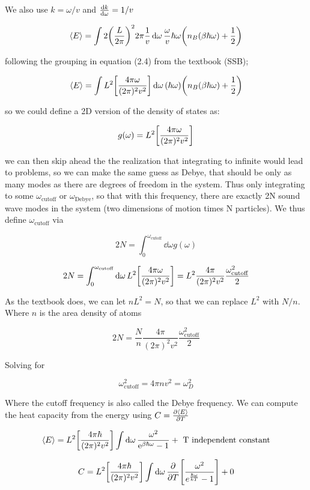 We also use $k=\omega/v$ and $\dv{k}{\omega} = 1/v$

\[ \avg{E} =  \int 2 \paren*{\frac{L}{2\pi}}^2 2 \pi \frac{1}{v} \dd{\omega} \frac{\omega}{v} \hbar \omega  \paren*{n_B ( \beta \hbar \omega) + \frac{1}{2}}\]

following the grouping in equation (2.4) from the textbook (SSB);

\[ \avg{E} =  \int L^2  \brackets*{\frac{4\pi\omega} {(2\pi)^2v^2 }} \dd{\omega} (\hbar \omega)  \paren*{n_B ( \beta \hbar \omega) + \frac{1}{2}}\]

so we could define a 2D version of the density of states as:

\[ g(\omega) = L^2  \brackets*{\frac{4\pi\omega} {(2\pi)^2v^2 }}\]

we can then skip ahead the the realization that integrating to infinite would lead to problems, so we can make the same guess as Debye, that should be only as many modes as there are degrees of freedom in the system. Thus only integrating to some $\omega_{\text{cutoff}}$ or $\omega_{\text{Debye}}$, so that with this frequency, there are exactly 2N sound wave modes in the system (two dimensions of motion times N particles). We thus define $\omega_{\text{cutoff}}$ via

\[ 2N = \int_{0}^{\omega_{\text{cutoff}}} \dd{\omega} g(\omega) \] 

\[ 2N = \int_{0}^{\omega_{\text{cutoff}}} \dd{\omega} L^2  \brackets*{\frac{4\pi\omega} {(2\pi)^2v^2 }}  = L^2 \frac{4 \pi}{(2 \pi)^2 v^2} \frac{\omega_{\text{cutoff}}^2}{2}\]

As the textbook does, we can let $nL^2 = N$, so that we can replace $L^2$ with $N/n$. Where $n$ is the area density of atoms

\[ 2N = \frac{N}{n} \frac{4 \pi }{(2 \pi)^2 v^2} \frac{\omega_{\text{cutoff}}^2}{2}\]

Solving for

\[ \omega_{\text{cutoff}}^2 = 4 \pi n v^2 = \omega^2_D\]

Where the cutoff frequency is also called the Debye frequency. We can compute the heat capacity from the energy using $C = \pdv{\langle E \rangle}{T}$

\[ \avg{E} =   L^2  \brackets*{\frac{4\pi \hbar} {(2\pi)^2v^2 }} \int \dd{\omega}   \frac{\omega^2}{\e^{\beta \hbar \omega}-1} +  \text{ T independent constant}\]

\[ C = L^2  \brackets*{\frac{4\pi \hbar} {(2\pi)^2v^2 }} \int \dd{\omega} \pdv{}{T} \brackets*{\frac{\omega^2}{e^\frac{\hbar \omega}{k T}-1}} + 0\]

